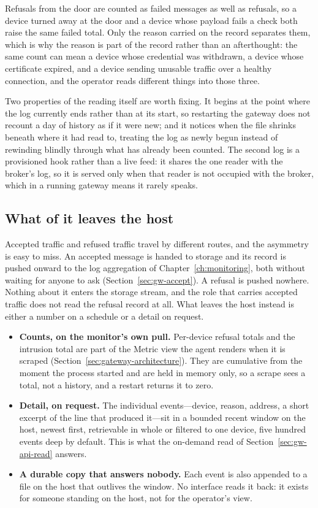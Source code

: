 \documentclass[12pt,a4paper]{report}
\begin{document}
Refusals from the door are counted as failed messages as well as
refusals, so a device turned away at the door and a device whose
payload fails a check both raise the same failed total. Only the reason
carried on the record separates them, which is why the reason is part
of the record rather than an afterthought: the same count can mean a
device whose credential was withdrawn, a device whose certificate
expired, and a device sending unusable traffic over a healthy
connection, and the operator reads different things into those three.

Two properties of the reading itself are worth fixing. It begins at the
point where the log currently ends rather than at its start, so
restarting the gateway does not recount a day of history as if it were
new; and it notices when the file shrinks beneath where it had read to,
treating the log as newly begun instead of rewinding blindly through
what has already been counted. The second log is a provisioned hook
rather than a live feed: it shares the one reader with the broker's
log, so it is served only when that reader is not occupied with the
broker, which in a running gateway means it rarely speaks.

\subsection{What of it leaves the host}
\label{sec:gw-detect-signals}

Accepted traffic and refused traffic travel by different routes, and
the asymmetry is easy to miss. An accepted message is handed to storage
and its record is pushed onward to the log aggregation of
Chapter~\ref{ch:monitoring}, both without waiting for anyone to ask
(Section~\ref{sec:gw-accept}). A refusal is pushed nowhere. Nothing
about it enters the storage stream, and the role that carries accepted
traffic does not read the refusal record at all. What leaves the host
instead is either a number on a schedule or a detail on request.

\begin{itemize}
    \item \textbf{Counts, on the monitor's own pull.} Per-device
    refusal totals and the intrusion total are part of the Metric view
    the agent renders when it is scraped
    (Section~\ref{sec:gateway-architecture}). They are cumulative from
    the moment the process started and are held in memory only, so a
    scrape sees a total, not a history, and a restart returns it to
    zero.
    \item \textbf{Detail, on request.} The individual events---device,
    reason, address, a short excerpt of the line that produced
    it---sit in a bounded recent window on the host, newest first,
    retrievable in whole or filtered to one device, five hundred
    events deep by default. This is what the on-demand read of
    Section~\ref{sec:gw-api-read} answers.
    \item \textbf{A durable copy that answers nobody.} Each event is
    also appended to a file on the host that outlives the window. No
    interface reads it back: it exists for someone standing on the
    host, not for the operator's view.
\end{itemize}
\end{document}
